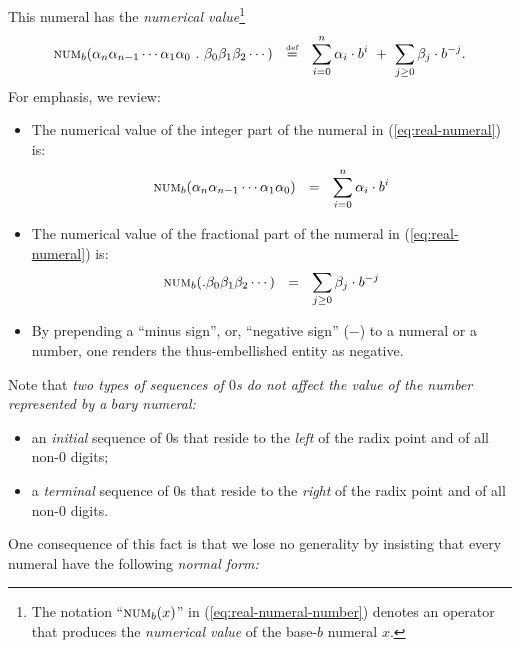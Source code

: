 \noindent
This numeral has the {\it numerical value}\footnote{The notation
  ``$\mbox{\sc num}_{b}(x)$'' in (\ref{eq:real-numeral-number})
  denotes an operator that produces the {\em numerical value} of the
  base-$b$ numeral $x$.}
\begin{equation}
\label{eq:real-numeral-number}
\mbox{\sc num}_{b}(\alpha_n \alpha_{n-1} \cdots \alpha_1 \alpha_0                  
\ . \ \beta_0 \beta_1 \beta_2 \cdots)
\ \ \stackrel{\mbox{{\tiny def}}}{=} \ \
\sum_{i=0}^n \alpha_i \cdot b^i
\ + \ \sum_{j\geq 0} \beta_j \cdot b^{-j}.
\end{equation}
\index{base-$b$ numeral!numerical value}
For emphasis, we review:
\begin{itemize}
\item
The numerical value of the integer part of the numeral in
(\ref{eq:real-numeral}) is:
\[
\mbox{\sc num}_{b}(\alpha_n \alpha_{n-1}\cdots \alpha_1 \alpha_0)
\ \ = \ \
\sum_{i=0}^n \alpha_i \cdot b^i
\]
\item
The numerical value of the fractional part of the numeral in
(\ref{eq:real-numeral}) is:
\[
\mbox{\sc num}_{b}(. \beta_0 \beta_1 \beta_2 \cdots)
\ \ = \ \
\sum_{j\geq 0} \beta_j \cdot b^{-j}
\]
\item
By prepending a ``minus sign'', or, ``negative sign'' ($-$) to a
numeral or a number, one renders the thus-embellished entity as
negative.
\end{itemize}

Note that {\em two types of sequences of $0$s do not affect the value
  of the number represented by a $b$ary numeral:}
\begin{itemize}
\item
an {\em initial} sequence of $0$s that reside to the {\em left} of the
radix point and of all non-$0$ digits;
\item
a {\em terminal} sequence of $0$s that reside to the {\em right} of
the radix point and of all non-$0$ digits.
\end{itemize}
One consequence of this fact is that we lose no generality by
insisting that every numeral have the following {\em normal form:}

\smallskip

